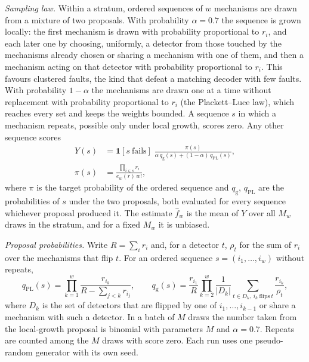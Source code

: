 \documentclass[aps,pre,onecolumn,superscriptaddress,nofootinbib,10pt]{revtex4-2}
\begin{document}
\emph{Sampling law.} Within a stratum, ordered sequences of $w$ mechanisms are drawn from a mixture of two proposals. With probability $\alpha=0.7$ the sequence is grown locally: the first mechanism is drawn with probability proportional to $r_i$, and each later one by choosing, uniformly, a detector from those touched by the mechanisms already chosen or sharing a mechanism with one of them, and then a mechanism acting on that detector with probability proportional to $r_i$. This favours clustered faults, the kind that defeat a matching decoder with few faults. With probability $1-\alpha$ the mechanisms are drawn one at a time without replacement with probability proportional to $r_i$ (the Plackett--Luce law), which reaches every set and keeps the weights bounded. A sequence $s$ in which a mechanism repeats, possible only under local growth, scores zero. Any other sequence scores
\begin{align}
Y(s)&=\mathbf{1}[s\ \text{fails}]\;\frac{\pi(s)}{\alpha\,q_{\mathrm g}(s)+(1-\alpha)\,q_{\mathrm{PL}}(s)},\\
\pi(s)&=\frac{\prod_{i\in s}r_i}{e_w(r)\,w!},\nonumber
\end{align}
where $\pi$ is the target probability of the ordered sequence and $q_{\mathrm g}$, $q_{\mathrm{PL}}$ are the probabilities of $s$ under the two proposals, both evaluated for every sequence whichever proposal produced it. The estimate $\hat f_w$ is the mean of $Y$ over all $M_w$ draws in the stratum, and for a fixed $M_w$ it is unbiased.

\emph{Proposal probabilities.} Write $R=\sum_ir_i$ and, for a detector $t$, $\rho_t$ for the sum of $r_i$ over the mechanisms that flip $t$. For an ordered sequence $s=(i_1,\dots,i_w)$ without repeats,
\begin{equation}
q_{\mathrm{PL}}(s)=\prod_{k=1}^{w}\frac{r_{i_k}}{R-\sum_{j<k}r_{i_j}},\qquad
q_{\mathrm g}(s)=\frac{r_{i_1}}{R}\prod_{k=2}^{w}\frac{1}{|D_k|}\sum_{t\in D_k,\ i_k\ \mathrm{flips}\ t}\frac{r_{i_k}}{\rho_t},
\end{equation}
where $D_k$ is the set of detectors that are flipped by one of $i_1,\dots,i_{k-1}$ or share a mechanism with such a detector. In a batch of $M$ draws the number taken from the local-growth proposal is binomial with parameters $M$ and $\alpha=0.7$. Repeats are counted among the $M$ draws with score zero. Each run uses one pseudo-random generator with its own seed.
\end{document}
